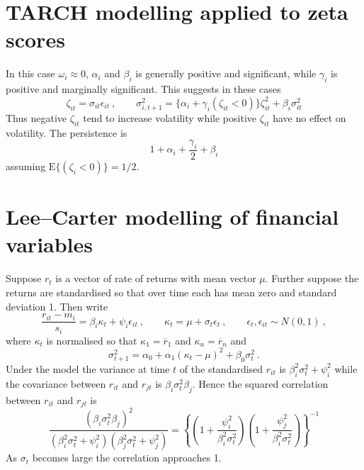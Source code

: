 \documentclass[authoryear]{elsarticle}
\newcommand{\E}{\mathrm{E}}
\newcommand{\eps}{\epsilon}
\newcommand{\cq}{\ , \qquad}
\begin{document}
 \section{TARCH modelling applied to zeta scores}
 
 In this case $\omega_i\approx 0$, $\alpha_i$ and $\beta_i$ is generally positive and significant, while $\gamma_i$ is positive and marginally significant.  This suggests in these cases
 $$
 \zeta_{it}=\sigma_{it}\eps_{it}\cq \sigma_{i,t+1}^2= \{\alpha_i + \gamma_i(\zeta_{it}<0)\}\zeta_{it}^2+\beta_i\sigma^2_{it} 
 $$
 Thus negative $\zeta_{it}$ tend to increase volatility while positive $\zeta_{it}$ have no effect on volatility.  The persistence is 
 $$
1+\alpha_i+\frac{\gamma_i}{2}+\beta_i
 $$
 assuming $\E\{(\zeta_i<0)\}=1/2$.   

\section{Lee--Carter modelling of financial variables}

Suppose $r_t$ is a vector of rate of returns with mean vector $\mu$.   Further suppose the returns are standardised so that over time each has mean zero and standard deviation 1.  Then write
$$
\frac{r_{it}-m_i}{s_i}=\beta_i\kappa_t+ \psi_i\eps_{it}\cq \kappa_t= \mu+\sigma_t\eps_t\cq  \eps_t,\eps_{it}\sim N(0,1)\ ,
$$
where $\kappa_t$ is normalised so that $\kappa_1=\overline r_1$ and $\kappa_n=\overline r_n$ and
$$
\sigma^2_{t+1} = \alpha_0+\alpha_1(\kappa_{t}-\mu)^2+ \beta_0 \sigma_t^2\ .
$$
Under the model the variance at time $t$ of the standardised $r_{it}$ is 
$\beta_i^2 \sigma^2_t + \psi^2_i$ while the covariance between $r_{it}$ and $r_{jt}$ is  $\beta_i\sigma^2_t\beta_j$.
Hence the squared correlation between $r_{it}$ and $r_{jt}$ is
$$
\frac{(\beta_i\sigma^2_t\beta_j)^2}{(\beta_i^2 \sigma^2_t + \psi^2_i)(\beta_j^2 \sigma^2_t + \psi^2_j)} = \left\{\left(1+\frac{\psi^2_i}{\beta_i^2\sigma_t^2}\right)\left(1+\frac{\psi^2_j}{\beta_i^2\sigma_t^2}\right)\right\}^{-1}
$$
As $\sigma_t$ becomes large the correlation approaches 1. 
\end{document}
